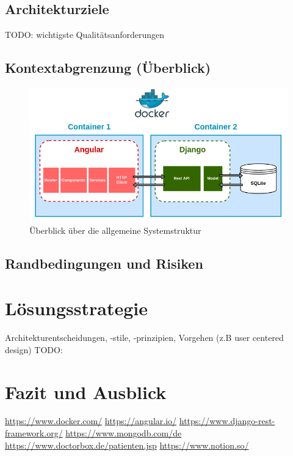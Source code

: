\documentclass[conference]{IEEEtran}
\begin{document}
\subsection{Architekturziele}
TODO: wichtigste Qualitätsanforderungen
\subsection{Kontextabgrenzung (Überblick)}
\begin{figure}[bhp]
	\centering
	\includegraphics[width=\columnwidth]{./figures/architecture_with_docker}
	\caption{Überblick über die allgemeine Systemstruktur}
\end{figure}
\subsection{Randbedingungen und Risiken}
\section{Lösungsstrategie}
Architekturentscheidungen, -stile, -prinzipien, Vorgehen (z.B user centered design)
TODO:
\section{Fazit und Ausblick}




\begin{thebibliography}{00}
 \url{https://www.docker.com/}
 \url{https://angular.io/}
 \url{https://www.django-rest-framework.org/}
 \url{https://www.mongodb.com/de}
 \url{https://www.doctorbox.de/patienten.jsp}
 \url{https://www.notion.so/}
\end{thebibliography}
\end{document}
